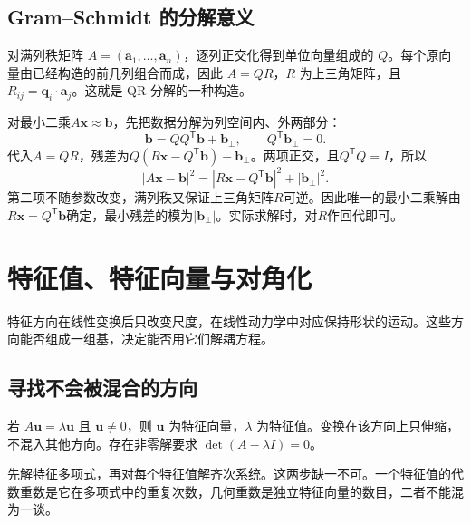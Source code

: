 \documentclass[11pt,openany,fontset=fandol]{ctexbook}
\theoremstyle{plain}\newtheorem{theorem}{定理}[chapter]\newtheorem{proposition}[theorem]{命题}
\theoremstyle{definition}\newtheorem{definition}{定义}[chapter]\newtheorem{example}{例}[chapter]
\theoremstyle{remark}\newtheorem*{remark}{说明}
\newcommand{\vct}[1]{\bm{#1}}\newcommand{\Rea}{\operatorname{Re}}\newcommand{\Ima}{\operatorname{Im}}
\begin{document}
\subsection{Gram--Schmidt 的分解意义}
对满列秩矩阵 $A=(\vct a_1,\ldots,\vct a_n)$，逐列正交化得到单位向量组成的 $Q$。每个原向量由已经构造的前几列组合而成，因此 $A=QR$，$R$ 为上三角矩阵，且 $R_{ij}=\vct q_i\cdot\vct a_j$。这就是 QR 分解的一种构造。

对最小二乘$A\vct x\approx\vct b$，先把数据分解为列空间内、外两部分：
\[
\vct b=QQ^{\mathsf T}\vct b+\vct b_\perp,
\qquad Q^{\mathsf T}\vct b_\perp=0.
\]
代入$A=QR$，残差为$Q(R\vct x-Q^{\mathsf T}\vct b)-\vct b_\perp$。两项正交，且$Q^{\mathsf T}Q=I$，所以
\[
|A\vct x-\vct b|^2
=|R\vct x-Q^{\mathsf T}\vct b|^2+|\vct b_\perp|^2.
\]
第二项不随参数改变，满列秩又保证上三角矩阵$R$可逆。因此唯一的最小二乘解由$R\vct x=Q^{\mathsf T}\vct b$确定，最小残差的模为$|\vct b_\perp|$。实际求解时，对$R$作回代即可。

\section{特征值、特征向量与对角化}
特征方向在线性变换后只改变尺度，在线性动力学中对应保持形状的运动。这些方向能否组成一组基，决定能否用它们解耦方程。

\subsection{寻找不会被混合的方向}
若 $A\vct u=\lambda\vct u$ 且 $\vct u\ne0$，则 $\vct u$ 为特征向量，$\lambda$ 为特征值。变换在该方向上只伸缩，不混入其他方向。存在非零解要求 $\det(A-\lambda I)=0$。

先解特征多项式，再对每个特征值解齐次系统。这两步缺一不可。一个特征值的代数重数是它在多项式中的重复次数，几何重数是独立特征向量的数目，二者不能混为一谈。
\end{document}
